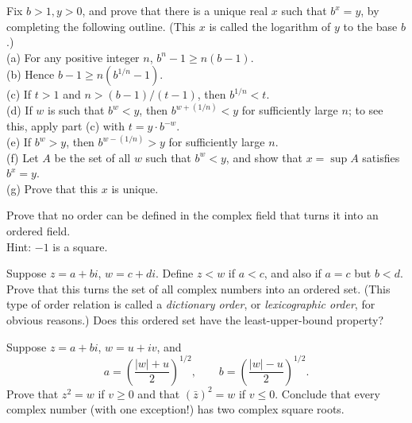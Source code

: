 \begin{myExercise}
    Fix $b>1, y>0$, and prove that there is a unique real $x$ such that $b^x =y$, by
    completing the following outline. (This $x$ is called the logarithm of $y$ to the base $b$.)\\
    (a) For any positive integer $n$, $b^n - 1 \geq n(b- 1)$.\\
    (b) Hence $b- 1 \geq n(b^{1/n}- 1)$.\\
    (c) If $t>1$ and $n> (b-1)/(t- 1)$, then $b^{1/n} < t$.\\
    (d) If $w$ is such that $b^w < y$, then $b^{w+(1/n)} < y$ for sufficiently large $n$; to see this,
    apply part (c) with $t =y \cdot b^{-w}$.\\    
    (e) If $b^w > y$, then $b^{w-(1/n)} > y$ for sufficiently large $n$.\\    
    (f) Let $A$ be the set of all $w$ such that $b^w < y$, and show that $x = \sup A$ satisfies $b^x =y$.\\    
    (g) Prove that this $x$ is unique.    
\end{myExercise}

\begin{myExercise}
    Prove that no order can be defined in the complex field that turns it into an ordered field. \\
    Hint: $-1$ is a square.
\end{myExercise}

\begin{myExercise}
    Suppose $z=a+ bi$, $w=c+di$. Define $z<w$ if $a<c$, and also if $a=c$ but
    $b < d$. Prove that this turns the set of all complex numbers into an ordered set.
    (This type of order relation is called a \emph{dictionary order}, or \emph{lexicographic order}, for
    obvious reasons.) Does this ordered set have the least-upper-bound property?
\end{myExercise}

\begin{myExercise}    
    Suppose $z = a + bi$, $w =u + iv$, and
    \begin{equation*}
        a = \left(\frac{|w|+u}{2}\right)^{1/2},\qquad
        b = \left(\frac{|w|-u}{2}\right)^{1/2}.
    \end{equation*}
    Prove that $z^2 = w$ if $v \geq 0$ and that $(\bar{z})^2 = w$ if $v \leq 0$. Conclude that every complex
    number (with one exception!) has two complex square roots.
\end{myExercise}

